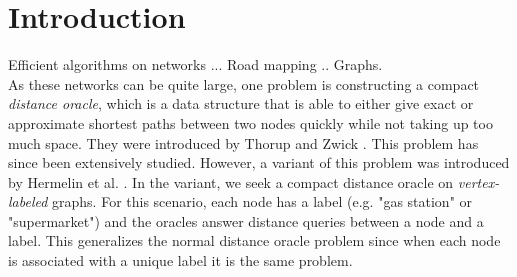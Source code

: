 \section{Introduction}\label{sec:introduction}
Efficient algorithms on networks ... Road mapping .. Graphs. \\
As these networks can be quite large, one problem is constructing a compact \textit{distance
oracle}, which is a data structure that is able to either give exact or approximate
shortest paths between two nodes quickly while not taking up too much space. They were
introduced by Thorup and Zwick \cite{thorup2005approximate}. This problem has since been
extensively studied. However, a variant of this problem
was introduced by Hermelin et al. \cite{hermelin2011distance}. In the variant, we seek a
compact distance oracle on \textit{vertex-labeled} graphs. For this scenario, each node has a label (e.g. "gas
station" or "supermarket") and the oracles answer distance queries between a node and a
label. This generalizes the normal distance oracle problem since when each node is
associated with a unique label it is the same problem. \\
